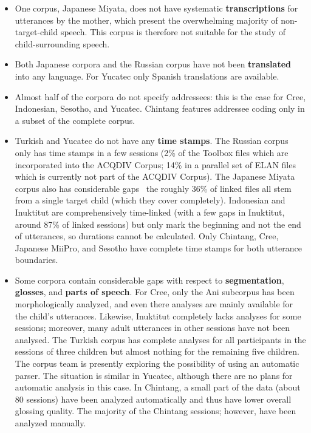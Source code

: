 \documentclass[a4paper, 11pt]{book}
\begin{document}
\begin{itemize}
	\item One corpus, Japanese Miyata, does not have systematic \textbf{transcriptions} for utterances by the mother, which present the overwhelming
		majority of non-target-child speech. This corpus is therefore not suitable for the study of child-surrounding speech. 
	\item Both Japanese corpora and the Russian corpus have not been \textbf{translated} into any language. For Yucatec only Spanish translations are available. 
	\item Almost half of the corpora do not specify addressees: this is the case for Cree, Indonesian, Sesotho, and Yucatec. Chintang features addressee coding
		only in a subset of the complete corpus. 
	\item Turkish and Yucatec do not have any \textbf{time stamps}. The Russian corpus only has time stamps in a few sessions (2\% of the Toolbox files which are incorporated
		into the ACQDIV Corpus; 14\% in a parallel set of ELAN files which is currently not part of the ACQDIV Corpus). The Japanese Miyata corpus also has considerable gaps
		\textendash\ the roughly 36\% of linked files all stem from a single target child (which they cover completely). Indonesian and Inuktitut 
		are comprehensively time-linked (with a few gaps in Inuktitut, around 87\% of linked sessions) but only mark the beginning and not the 
		end of utterances, so durations cannot be calculated. Only Chintang, Cree, Japanese MiiPro, and Sesotho have complete time stamps 
		for both utterance boundaries. 
	\item Some corpora contain considerable gaps with respect to \textbf{segmentation}, \textbf{glosses}, and \textbf{parts of speech}. For Cree, only the Ani subcorpus 
		has been morphologically analyzed, and even there analyses are mainly available for the child’s utterances. Likewise, Inuktitut completely lacks analyses for
		some sessions; moreover, many adult utterances in other sessions have not been analysed. The Turkish corpus has complete analyses for all participants 
		in the sessions of three children but almost nothing for the remaining five children. The corpus team is presently exploring the possibility
		of using an automatic parser. The situation is similar in Yucatec, although there are no plans for automatic analysis in this case.  
		In Chintang, a small part of the data (about 80 sessions) have been analyzed automatically and thus have lower overall glossing quality. The majority
		of the Chintang sessions; however, have been analyzed manually.

\end{itemize}
\end{document}
